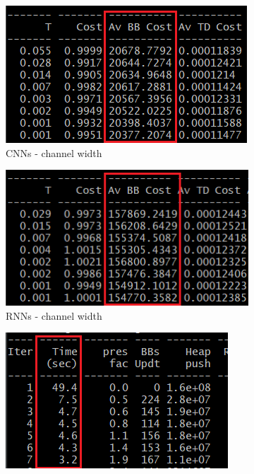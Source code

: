 \begin{figure}
	\begin{subfigure}[b]{0.49\linewidth}
		\includegraphics[width=\linewidth]{plots/log_place_ref.png}
		\caption{\glspl{CNN} - channel width}
	\end{subfigure}
	\begin{subfigure}[b]{0.49\linewidth}
		\includegraphics[width=\linewidth]{plots/log_place_cnn.png}
		\caption{\glspl{RNN} - channel width}
	\end{subfigure}
	\begin{subfigure}[b]{0.49\linewidth}
		\includegraphics[width=\linewidth]{plots/log_route_ref.png}

\end{subfigure}
\end{figure}
